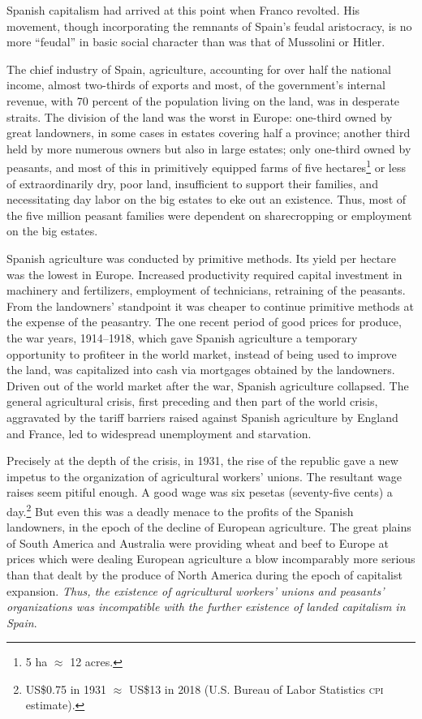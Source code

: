 {\indexFFranco}
Spanish capitalism had arrived at this point when Franco revolted. His movement, though incorporating the remnants of Spain’s feudal aristocracy, is no more ``feudal'' in basic social character than was that of Mussolini or Hitler.

The chief industry of Spain, agriculture, accounting for over half the national income, almost two-thirds of exports and most, of the government’s internal revenue, with 70 percent of the population living on the land, was in desperate straits. The division of the land was the worst in Europe: one-third owned by great landowners, in some cases in estates covering half a province; another third held by more numerous owners but also in large estates; only one-third owned by peasants, and most of this in primitively equipped farms of five hectares\footnote{5 ha \( \approx \) 12 acres.} or less of extraordinarily dry, poor land, insufficient to support their families, and necessitating day labor on the big estates to eke out an existence. Thus, most of the five million peasant families were dependent on sharecropping or employment on the big estates.

Spanish agriculture was conducted by primitive methods. Its yield per hectare was the lowest in Europe. Increased productivity required capital investment in machinery and fertilizers, employment of technicians, retraining of the peasants. From the landowners’ standpoint it was cheaper to continue primitive methods at the expense of the peasantry. The one recent period of good prices for produce, the war years, 1914--1918, which gave Spanish agriculture a temporary opportunity to profiteer in the world market, instead of being used to improve the land, was capitalized into cash via mortgages obtained by the landowners. Driven out of the world market after the war, Spanish agriculture collapsed. The general agricultural crisis, first preceding and then part of the world crisis, aggravated by the tariff barriers raised against Spanish agriculture by England and France, led to widespread unemployment and starvation. 

Precisely at the depth of the crisis, in 1931, the rise of the republic gave a new impetus to the organization of agricultural workers’ unions. The resultant wage raises seem pitiful enough. A good wage was six pesetas (seventy-five cents) a day.\footnote{US\$0.75 in 1931 $\approx$ US\$13 in 2018 (U.S. Bureau of Labor Statistics \textsc{cpi} estimate).} But even this was a deadly menace to the profits of the Spanish landowners, in the epoch of the decline of European agriculture. The great plains of South America and Australia were providing wheat and beef to Europe at prices which were dealing European agriculture a blow incomparably more serious than that dealt by the produce of North America during the epoch of capitalist expansion. \emph{Thus, the existence of agricultural workers’ unions and peasants’ organizations was incompatible with the further existence of landed capitalism in Spain}.

